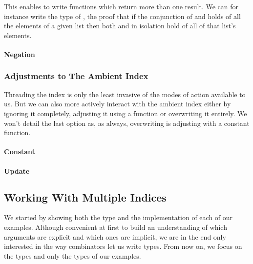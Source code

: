 
This enables to write functions which return more than one result. We can
for instance write the type of , the proof that if the conjunction
of  and  holds of all the elements of a given list then both
 and  in isolation hold of all of that list's elements.

\paragraph{Negation}


\subsubsection{Adjustments to The Ambient Index}

Threading the index is only the least invasive of the modes of action
available to us. But we can also more actively interact with the ambient
index either by ignoring it completely, adjusting it using a function
or overwriting it entirely. We won't detail the last option as, as always,
overwriting is adjusting with a constant function.

\paragraph{Constant}\todo{}

\paragraph{Update}\todo{}



\subsection{Working With Multiple Indices}

We started by showing both the type and the implementation of each of our
examples. Although convenient at first to build an understanding of which
arguments are explicit and which ones are implicit, we are in the end only
interested in the way combinators let us write types. From now on, we
focus on the types and only the types of our examples.

